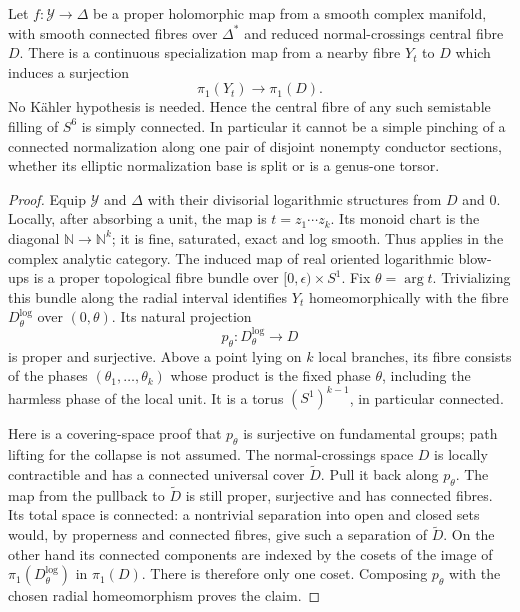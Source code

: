 \begin{theorem}\label{push:B42}
Let $f:\mathcal Y\to\Delta$ be a
proper holomorphic map from a smooth
complex manifold, with smooth connected
fibres over $\Delta^*$ and reduced
normal-crossings central fibre $D$.
There is a continuous specialization
map from a nearby fibre $Y_t$ to $D$
which induces a surjection
\[
 \pi_1(Y_t)\longrightarrow\pi_1(D).
\]
No K\"ahler hypothesis is needed.
Hence the central fibre of any such
semistable filling of $S^6$ is simply
connected. In particular it cannot
be a simple pinching of a connected
normalization along one pair of
disjoint nonempty conductor sections,
whether its elliptic normalization
base is split or is a genus-one torsor.
\end{theorem}
\begin{proof}
Equip $\mathcal Y$ and $\Delta$ with
their divisorial logarithmic structures
from $D$ and $0$. Locally, after
absorbing a unit, the map is
$t=z_1\cdots z_k$. Its monoid chart
is the diagonal
$\mathbb N\to\mathbb N^k$; it is
fine, saturated, exact and log smooth.
Thus \cite[Theorem 5.1, p.2226]{NO10}
applies in the complex analytic
category. The induced map of real
oriented logarithmic blow-ups is a
proper topological fibre bundle over
$[0,\epsilon)\times S^1$.
Fix $\theta=\arg t$. Trivializing
this bundle along the radial interval
identifies $Y_t$ homeomorphically with
the fibre $D^{\log}_\theta$ over
$(0,\theta)$. Its natural projection
\[
 p_\theta:D^{\log}_\theta\longrightarrow D
\]
is proper and surjective. Above a
point lying on $k$ local branches,
its fibre consists of the phases
$(\theta_1,\ldots,\theta_k)$ whose
product is the fixed phase $\theta$,
including the harmless phase of the
local unit. It is a torus
$(S^1)^{k-1}$, in particular connected.

Here is a covering-space proof that
$p_\theta$ is surjective on fundamental
groups; path lifting for the collapse
is not assumed. The normal-crossings
space $D$ is locally contractible
and has a connected universal cover
$\widetilde D$. Pull it back along
$p_\theta$. The map from the pullback
to $\widetilde D$ is still proper,
surjective and has connected fibres.
Its total space is connected: a
nontrivial separation into open and
closed sets would, by properness and
connected fibres, give such a
separation of $\widetilde D$.
On the other hand its connected
components are indexed by the cosets
of the image of
$\pi_1(D^{\log}_\theta)$ in $\pi_1(D)$.
There is therefore only one coset.
Composing $p_\theta$ with the chosen
radial homeomorphism proves the claim.


\end{proof}
